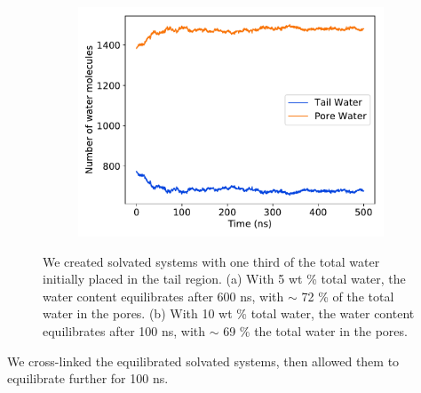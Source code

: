 \documentclass{article}
\begin{document}
\begin{figure}
\begin{subfigure}{0.45\textwidth}
  \includegraphics[width=\textwidth]{10wt_offset_equil.pdf}
  \caption{}\label{fig:10wt_offset_equil}
  \end{subfigure}
  \caption{We created solvated systems with one third of the total water
	  initially placed in the tail region. (a) With 5 wt \% total water, the water
	  content equilibrates after 600 ns, with $\sim$ 72 \% of the total water in the
	  pores. (b) With 10 wt \% total water, the water content equilibrates after 100
	  ns, with $\sim$ 69 \% the total water in the
	  pores.}\label{fig:solvation_equilibration}
  \end{figure}

  We cross-linked the equilibrated solvated systems, then allowed them to 
  equilibrate further for 100 ns. 
\end{document}
